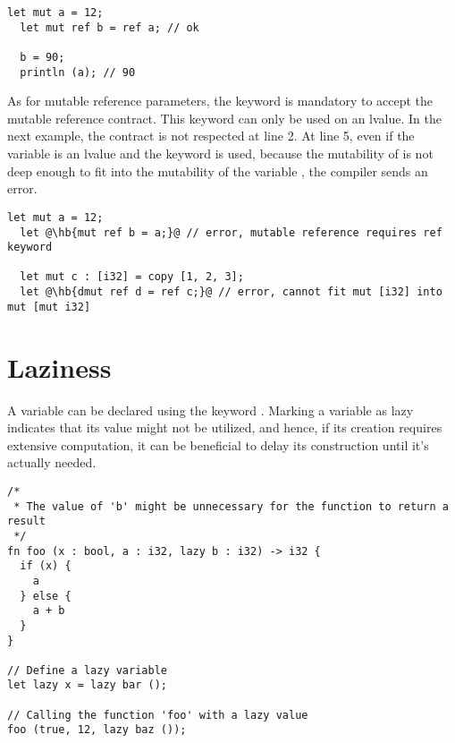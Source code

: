 \begin{lstlisting}[style=coloredverbatim, escapechar=@]
  let mut a = 12;
  let mut ref b = ref a; // ok

  b = 90;
  println (a); // 90
\end{lstlisting}

As for mutable reference parameters, the keyword  is mandatory to
accept the mutable reference contract. This keyword can only be used on an
lvalue. In the next example, the contract is not respected at line 2. At line 5,
even if the variable is an lvalue and the keyword  is used, because
the mutability of  is not deep enough to fit into the mutability of the
variable , the compiler sends an error.

\begin{lstlisting}[style=coloredverbatim, escapechar=@]
  let mut a = 12;
  let @\hb{mut ref b = a;}@ // error, mutable reference requires ref keyword

  let mut c : [i32] = copy [1, 2, 3];
  let @\hb{dmut ref d = ref c;}@ // error, cannot fit mut [i32] into mut [mut i32]
\end{lstlisting}

\vfill%
\pagebreak

\section{Laziness}
\label{sec:variable_laziness}

A variable can be declared using the keyword . Marking a variable as
lazy indicates that its value might not be utilized, and hence, if its creation
requires extensive computation, it can be beneficial to delay its construction
until it's actually needed.


\begin{lstlisting}[style=coloredverbatim]
/*
 * The value of 'b' might be unnecessary for the function to return a result
 */
fn foo (x : bool, a : i32, lazy b : i32) -> i32 {
  if (x) {
    a
  } else {
    a + b
  }
}

// Define a lazy variable
let lazy x = lazy bar ();

// Calling the function 'foo' with a lazy value
foo (true, 12, lazy baz ());
\end{lstlisting}

